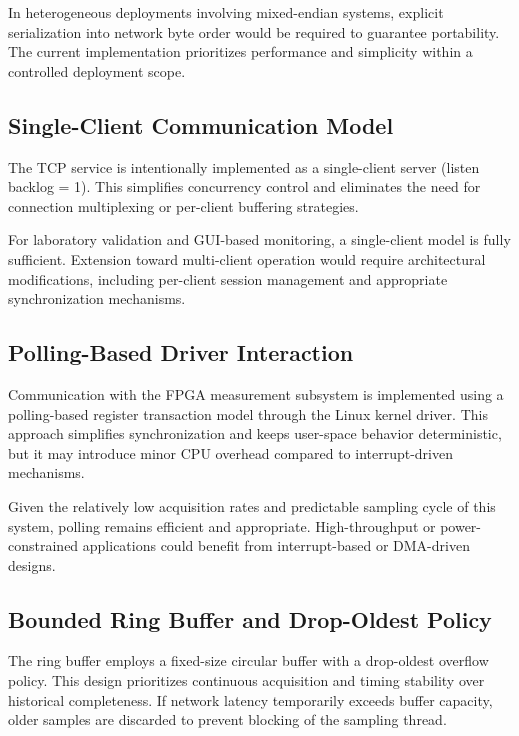 In heterogeneous deployments involving mixed-endian systems, explicit serialization into network byte order would be required to guarantee portability. The current implementation prioritizes performance and simplicity within a controlled deployment scope.

\subsection{Single-Client Communication Model}

The TCP service is intentionally implemented as a single-client server (listen backlog = 1). This simplifies concurrency control and eliminates the need for connection multiplexing or per-client buffering strategies.

For laboratory validation and GUI-based monitoring, a single-client model is fully sufficient. Extension toward multi-client operation would require architectural modifications, including per-client session management and appropriate synchronization mechanisms.

\subsection{Polling-Based Driver Interaction}

Communication with the FPGA measurement subsystem is implemented using a polling-based register transaction model through the Linux kernel driver. This approach simplifies synchronization and keeps user-space behavior deterministic, but it may introduce minor CPU overhead compared to interrupt-driven mechanisms.

Given the relatively low acquisition rates and predictable sampling cycle of this system, polling remains efficient and appropriate. High-throughput or power-constrained applications could benefit from interrupt-based or DMA-driven designs.

\subsection{Bounded Ring Buffer and Drop-Oldest Policy}

The ring buffer employs a fixed-size circular buffer with a drop-oldest overflow policy. This design prioritizes continuous acquisition and timing stability over historical completeness. If network latency temporarily exceeds buffer capacity, older samples are discarded to prevent blocking of the sampling thread.

